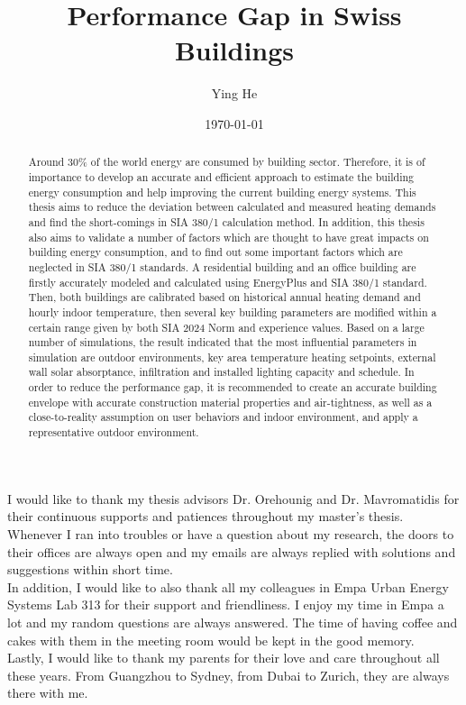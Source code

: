 \documentclass[a4paper, oneside]{discothesis}
\title{Performance Gap in Swiss Buildings}
\author{Ying He}
\institute{Chair of Building Physics\\[2pt]
ETH Zürich\\[2pt]
Laboratory for Urban Energy Systems\\[2pt]
Empa,Dübendorf\\[2pt]}
\date{\today}
\begin{document}
\frontmatter %
\maketitle

\cleardoublepage

\begin{acknowledgements}
 I would like to thank my thesis advisors Dr. Orehounig and Dr. Mavromatidis for their continuous supports and patiences throughout my master's thesis. Whenever I ran into troubles or have a question about my research, the doors to their offices are always open and my emails are always replied with solutions and suggestions within short time.\\
 In addition, I would like to also thank all my colleagues in Empa Urban Energy Systems Lab 313 for their support and friendliness. I enjoy my time in Empa a lot and my random questions are always answered. The time of having coffee and cakes with them in the meeting room would be kept in the good memory.\\
 Lastly, I would like to thank my parents for their love and care throughout all these years. From Guangzhou to Sydney, from Dubai to Zurich, they are always there with me.


\end{acknowledgements}


\begin{abstract}
 	Around 30\% of the world energy are consumed by building sector. Therefore, it is of importance to develop an accurate and efficient approach to estimate the building energy consumption and help improving the current building energy systems. This thesis aims to reduce the deviation between calculated and measured heating demands and find the short-comings in SIA 380/1 calculation method. In addition, this thesis also aims to validate a number of factors which are thought to have great impacts on building energy consumption, and to find out some important factors which are neglected in SIA 380/1 standards. A residential building and an office building are firstly accurately modeled and calculated using EnergyPlus and SIA 380/1 standard. Then, both buildings are  calibrated based on historical annual heating demand and hourly indoor temperature, then several key building parameters are modified within a certain range given by both SIA 2024 Norm and experience values. Based on a large number of simulations, the result indicated that the most influential parameters in simulation are outdoor environments, key area temperature heating setpoints, external wall solar absorptance, infiltration and installed lighting capacity and schedule. In order to reduce the performance gap, it is recommended to create an accurate building envelope with accurate construction material properties and air-tightness, as well as a close-to-reality assumption on user behaviors and indoor environment, and apply a representative outdoor environment.
\end{abstract}
\end{document}
